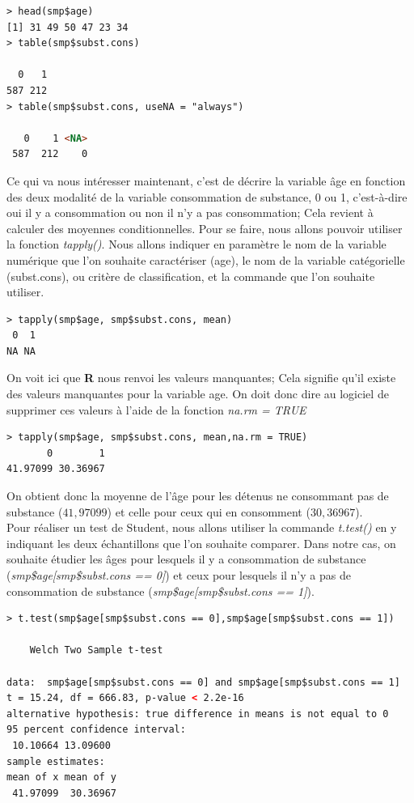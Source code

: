 \begin{lstlisting}[language=html]
 > head(smp$age)
[1] 31 49 50 47 23 34
> table(smp$subst.cons)

  0   1 
587 212 
> table(smp$subst.cons, useNA = "always")

   0    1 <NA> 
 587  212    0 
\end{lstlisting}

Ce qui va nous intéresser maintenant, c'est de décrire la variable âge en fonction des deux modalité de la variable consommation de substance,  0 ou 1, c'est-à-dire oui il y a consommation ou non il n'y a pas consommation; Cela revient à calculer des moyennes conditionnelles.\newline
Pour se faire, nous allons pouvoir utiliser la fonction \textit{tapply()}. Nous allons indiquer en paramètre le nom de la variable numérique que l'on souhaite caractériser (age), le nom de la variable catégorielle (subst.cons), ou critère de classification, et la commande que l'on souhaite utiliser.
\begin{lstlisting}[language=html]
> tapply(smp$age, smp$subst.cons, mean)
 0  1 
NA NA 
\end{lstlisting}
On voit ici que \textbf{R} nous renvoi les valeurs manquantes; Cela signifie qu'il existe des valeurs manquantes pour la variable age. On doit donc dire au logiciel de supprimer ces valeurs à l'aide de la fonction \textit{na.rm = TRUE}
\begin{lstlisting}[language=html]
> tapply(smp$age, smp$subst.cons, mean,na.rm = TRUE)
       0        1 
41.97099 30.36967 
\end{lstlisting}
On obtient donc la moyenne de l'âge pour les détenus ne consommant pas de substance ($41,97099$) et celle pour ceux qui en consomment ($30,36967$).\newline
\\
Pour réaliser un test de Student, nous allons utiliser la commande \textit{t.test()} en y indiquant les deux échantillons que l'on souhaite comparer. Dans notre cas, on souhaite étudier les âges pour lesquels il y a consommation de substance (\textit{smp\$age[smp\$subst.cons == 0]}) et ceux pour lesquels il n'y a pas de consommation de substance (\textit{smp\$age[smp\$subst.cons == 1]}).

\begin{lstlisting}[language=html]
> t.test(smp$age[smp$subst.cons == 0],smp$age[smp$subst.cons == 1])

	Welch Two Sample t-test

data:  smp$age[smp$subst.cons == 0] and smp$age[smp$subst.cons == 1]
t = 15.24, df = 666.83, p-value < 2.2e-16
alternative hypothesis: true difference in means is not equal to 0
95 percent confidence interval:
 10.10664 13.09600
sample estimates:
mean of x mean of y 
 41.97099  30.36967 
\end{lstlisting}

